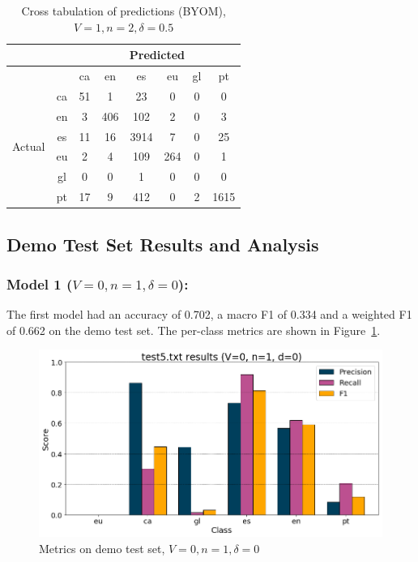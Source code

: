 \documentclass[runningheads]{llncs}
\begin{document}
\begin{table}
	\centering
	\caption{Cross tabulation of predictions (BYOM), $V=1, n=2, \delta=0.5$}
	\label{tab:pre_demo_confusion_BYOM}
	\begin{tabular}{|c|c|c|c|c|c|c|c|} \hline
		& & \multicolumn{6}{c|}{Predicted} \\ \hline
		& &  ca &   en &    es &   eu &  gl &    pt \\ \hline
		\multirow{6}{*}{Actual} & ca   &  51 &    1 &    23 &    0 &   0 &     0 \\
		& en   &   3 &  406 &   102 &    2 &   0 &     3 \\
		& es   &  11 &   16 &  3914 &    7 &   0 &    25 \\
		& eu   &   2 &    4 &   109 &  264 &   0 &     1 \\
		& gl   &   0 &    0 &     1 &    0 &   0 &     0 \\
		& pt   &  17 &    9 &   412 &    0 &   2 &  1615 \\ \hline
	\end{tabular}
\end{table}

\newpage

\subsection{Demo Test Set Results and Analysis}

\subsubsection{Model 1 ($V=0, n=1, \delta=0$): }
The first model had an accuracy of 0.702, a macro F1 of 0.334 and a weighted F1 of 0.662 on the demo test set. The per-class metrics are shown in Figure~\ref{fig:demo_0_1_0}. \\

\begin{figure}
    \begin{center}
        \includegraphics[width=12.5cm]{images/test5_results_0_1_0.png}
        \caption{Metrics on demo test set, $V=0, n=1, \delta=0$}
        \label{fig:demo_0_1_0}
    \end{center}
\end{figure}
\end{document}
